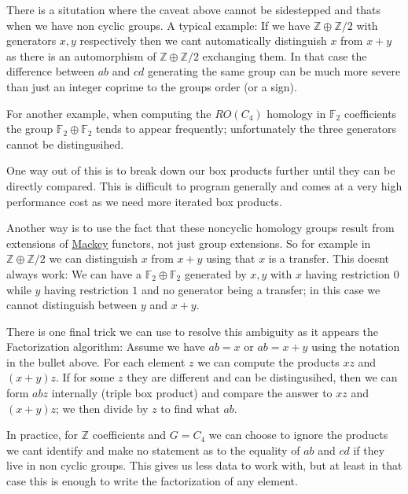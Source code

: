 \begin{DoxyItemize}
\item There is a situtation where the caveat above cannot be sidestepped and that\textquotesingle{}s when we have non cyclic groups. A typical example\+: If we have $\mathbb Z\oplus \mathbb Z/2$ with generators $x,y$ respectively then we can\textquotesingle{}t automatically distinguish $x$ from $x+y$ as there is an automorphism of $\mathbb Z\oplus \mathbb Z/2$ exchanging them. In that case the difference between $ab$ and $cd$ generating the same group can be much more severe than just an integer coprime to the group\textquotesingle{}s order (or a sign).
\item For another example, when computing the $RO(C_4)$ homology in $\mathbb F_2$ coefficients the group $\mathbb F_2\oplus \mathbb F_2$ tends to appear frequently; unfortunately the three generators cannot be distingusihed.
\item One way out of this is to break down our box products further until they can be directly compared. This is difficult to program generally and comes at a very high performance cost as we need more iterated box products.
\item Another way is to use the fact that these noncyclic homology groups result from extensions of \hyperlink{namespaceMackey}{Mackey} functors, not just group extensions. So for example in $\mathbb Z\oplus \mathbb Z/2$ we can distinguish $x$ from $x+y$ using that $x$ is a transfer. This doesn\textquotesingle{}t always work\+: We can have a $\mathbb F_2\oplus \mathbb F_2$ generated by $x,y$ with $x$ having restriction $0$ while $y$ having restriction $1$ and no generator being a transfer; in this case we cannot distinguish between $y$ and $x+y$.
\item There is one final trick we can use to resolve this ambiguity as it appears the Factorization algorithm\+: Assume we have $ab=x$ or $ab=x+y$ using the notation in the bullet above. For each element $z$ we can compute the products $xz$ and $(x+y)z$. If for some $z$ they are different and can be distingusihed, then we can form $abz$ internally (triple box product) and compare the answer to $xz$ and $(x+y)z$; we then divide by $z$ to find what $ab$.
\end{DoxyItemize}

In practice, for $\mathbb Z$ coefficients and $G=C_4$ we can choose to ignore the products we can\textquotesingle{}t identify and make no statement as to the equality of $ab$ and $cd$ if they live in non cyclic groups. This gives us less data to work with, but at least in that case this is enough to write the factorization of any element.

